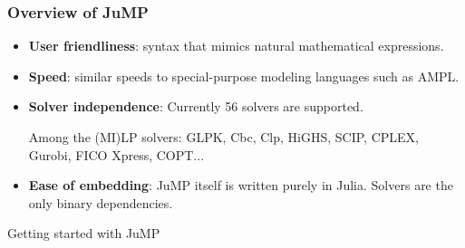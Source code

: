 \documentclass[]{beamer}
\newcommand*{\blue}[1]{\textcolor{nblue}{#1}}
\begin{document}
\begin{frame}
  \frametitle{Overview of JuMP}
\vspace{3mm}


\begin{itemize}
\item \blue{\textbf{User friendliness}}:
syntax that mimics natural mathematical expressions.
\bigskip
\pause

\item \blue{\textbf{Speed}}:
similar speeds to special-purpose modeling languages such as AMPL.
\bigskip
\pause

\item \blue{\textbf{Solver independence}}:
Currently 56 solvers are supported. \vspace{2mm}

Among the (MI)LP solvers: GLPK, Cbc, Clp, HiGHS, SCIP, CPLEX, Gurobi, FICO Xpress, COPT...
\bigskip
\pause

\item \blue{\textbf{Ease of embedding}}:
JuMP itself is written purely in Julia. Solvers are the only binary dependencies.

\end{itemize}

\end{frame}

% 
%
\begin{frame}

\begin{center} 
\Large{Getting started with JuMP}
\end{center}
              
\end{frame}

% 
%
\end{document}
